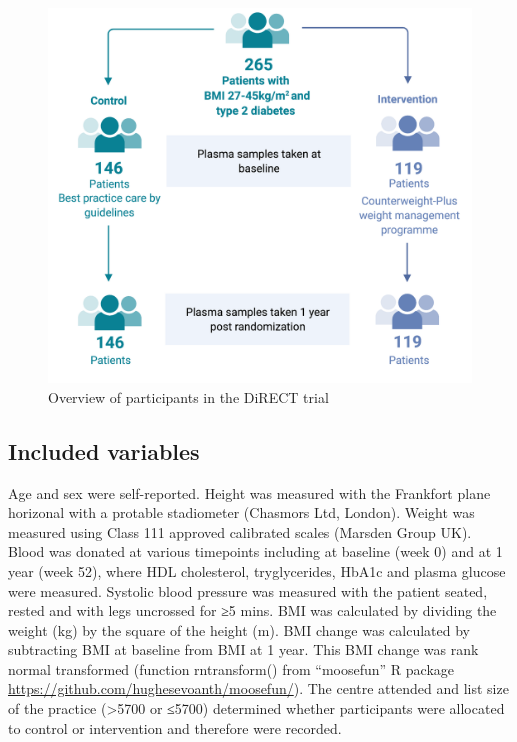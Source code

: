 \documentclass[11pt,twoside]{bristolthesis}
\begin{document}
\begin{figure}
\includegraphics{figure/DiRECT/DiRECT_study_summary} \caption[Overview of participants in the DiRECT trial]{Overview of participants in the DiRECT trial}\label{fig:direct-participants}
\end{figure}
\hypertarget{included-variables}{%
\subsection{Included variables}\label{included-variables}}

Age and sex were self-reported. Height was measured with the Frankfort plane horizonal with a protable stadiometer (Chasmors Ltd, London). Weight was measured using Class 111 approved calibrated scales (Marsden Group UK). Blood was donated at various timepoints including at baseline (week 0) and at 1 year (week 52), where HDL cholesterol, tryglycerides, HbA1c and plasma glucose were measured. Systolic blood pressure was measured with the patient seated, rested and with legs uncrossed for ≥5 mins. BMI was calculated by dividing the weight (kg) by the square of the height (m). BMI change was calculated by subtracting BMI at baseline from BMI at 1 year. This BMI change was rank normal transformed (function rntransform() from ``moosefun'' R package \url{https://github.com/hughesevoanth/moosefun/}). The centre attended and list size of the practice (\textgreater5700 or ≤5700) determined whether participants were allocated to control or intervention and therefore were recorded.
\end{document}
